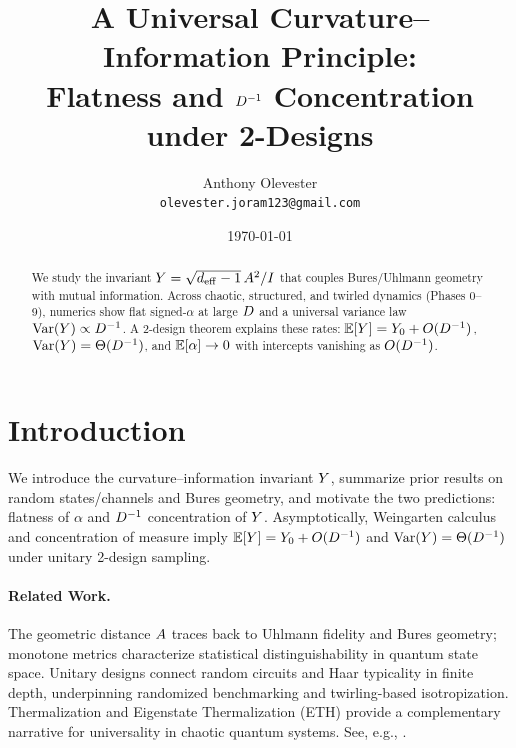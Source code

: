\documentclass[11pt]{article}
\title{A Universal Curvature--Information Principle:\\ Flatness and $D^{-1}$ Concentration under 2-Designs}
\author{Anthony Olevester\\ \small\texttt{olevester.joram123@gmail.com}}
\date{\today}
\begin{document}
\maketitle

\begin{abstract}
We study the invariant $Y=\sqrt{d_{\mathrm{eff}}-1}\,A^2/I$ that couples Bures/Uhlmann geometry with mutual information.
Across chaotic, structured, and twirled dynamics (Phases 0--9), numerics show flat signed-$\alpha$ at large $D$ and a universal variance law $\mathrm{Var}(Y)\propto D^{-1}$. A 2-design theorem explains these rates: $\mathbb{E}[Y]=Y_0+O(D^{-1})$, $\mathrm{Var}(Y)=\Theta(D^{-1})$, and $\mathbb{E}[\alpha]\to 0$ with intercepts vanishing as $O(D^{-1})$.
\end{abstract}

\graphicspath{{figures/}}

\section{Introduction}
We introduce the curvature--information invariant $Y$, summarize prior results on random states/channels and Bures geometry, and motivate the two predictions: flatness of $\alpha$ and $D^{-1}$ concentration of $Y$. Asymptotically, Weingarten calculus and concentration of measure imply $\mathbb{E}[Y]=Y_0+O(D^{-1})$ and $\mathrm{Var}(Y)=\Theta(D^{-1})$ under unitary 2-design sampling.

\paragraph{Related Work.}
The geometric distance $A$ traces back to Uhlmann fidelity and Bures geometry; monotone metrics characterize statistical distinguishability in quantum state space. Unitary designs connect random circuits and Haar typicality in finite depth, underpinning randomized benchmarking and twirling-based isotropization. Thermalization and Eigenstate Thermalization (ETH) provide a complementary narrative for universality in chaotic quantum systems. See, e.g., \cite{uhlmann1976,hubner1994,dittmann1999,weingarten,HaydenWinter2006,page1993,lubkin1978,dankert2009,brandao2016,magesan2012,harrowlow2009,dalessio2016}.


\end{document}
